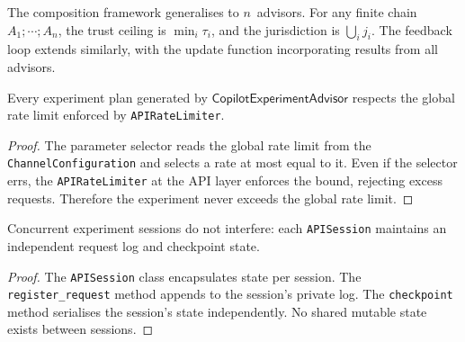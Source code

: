 \documentclass[11pt]{article}
\newcommand{\ExpAdv}{\mathsf{CopilotExperimentAdvisor}}
\begin{document}
\begin{remark}
The composition framework generalises to $n$~advisors.
For any finite chain $A_1 \mathbin{;} \cdots \mathbin{;} A_n$,
the trust ceiling is $\min_i \tau_i$, and the jurisdiction
is $\bigcup_i j_i$.  The feedback loop extends similarly,
with the update function incorporating results from all
advisors.
\end{remark}

\begin{lemma}\label{lem:ratelimit}
Every experiment plan generated by $\ExpAdv$ respects the
global rate limit enforced by \texttt{APIRateLimiter}.
\end{lemma}
\begin{proof}
The parameter selector reads the global rate limit from
the \texttt{ChannelConfiguration} and selects a rate at
most equal to it.  Even if the selector errs, the
\texttt{APIRateLimiter} at the API layer enforces the
bound, rejecting excess requests.  Therefore the experiment
never exceeds the global rate limit.
\end{proof}

\begin{lemma}\label{lem:sessiso}
Concurrent experiment sessions do not interfere:
each \texttt{APISession} maintains an independent
request log and checkpoint state.
\end{lemma}
\begin{proof}
The \texttt{APISession} class encapsulates state
per session.  The \texttt{register\_request} method
appends to the session's private log.  The
\texttt{checkpoint} method serialises the session's
state independently.  No shared mutable state exists
between sessions.
\end{proof}
\end{document}
